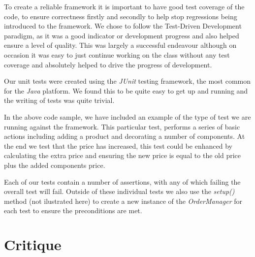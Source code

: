 \documentclass[pdftex,11pt,a4paper]{article}
\begin{document}
To create a reliable framework it is important to have good test coverage of the code, to ensure correctness firstly and secondly to help stop regressions being introduced to the framework. We chose to follow the Test-Driven Development paradigm, as it was a good indicator or development progress and also helped ensure a level of quality. This was largely a successful endeavour although on occasion it was easy to just continue working on the class without any test coverage and absolutely helped to drive the progress of development.

Our unit tests were created using the \emph{JUnit} testing framework\cite{website:junit}, the most common for the \emph{Java} platform. We found this to be quite easy to get up and running and the writing of tests was quite trivial.



In the above code sample, we have included an example of the type of test we are running against the framework. This particular test, performs a series of basic actions including adding a product and decorating a number of components. At the end we test that the price has increased, this test could be enhanced by calculating the extra price and ensuring the new price is equal to the old price plus the added components price.

Each of our tests contain a number of assertions, with any of which failing the overall test will fail. Outside of these individual tests we also use the \emph{setup()} method (not ilustrated here) to create a new instance of the \emph{OrderManager} for each test to ensure the preconditions are met.
\pagebreak


\section{Critique}
\end{document}
